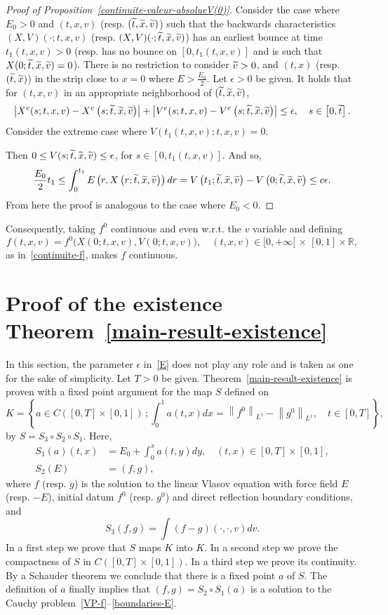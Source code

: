 \documentclass[AHL,Unicode,longabstracts,published]{cedram}
\newcommand{\R}{\mathbb{R}}
\let\oldtilde\tilde
\renewcommand*{\tilde}[1]{\mathchoice{\widetilde{#1}}{\widetilde{#1}}{\oldtilde{#1}}{\oldtilde{#1}}}
\begin{document}
\begin{proof}[{Proof of Proposition~\ref{continuite-valeur-absolueV(0)}}]
Consider the case where $E_0>0$ and $(t,x,v)$ (resp. $(\tilde{t},\tilde{x},\tilde{v})$) such that the backwards characteristics $(X,V)(\cdot;t,x,v)$ (resp. $(X,V)(\cdot;\tilde{t},\tilde{x},\tilde{v})$) has an earliest bounce at time $t_1(t,x,v)>0$ (resp. has no bounce on $[0,t_1(t,x,v)]$ and is such that $X(0;\tilde{t},\tilde{x},\tilde{v})= 0$). There is no restriction to consider $\tilde{v}>0$, and $(t,x)$ (resp. $(\tilde{t},\tilde{x})$) in the strip close to $x=0$ where $E>\frac{E_0}{2}$. Let $\epsilon >0$ be given. It holds that for $(t,x,v)$ in an appropriate neighborhood of $(\tilde{t},\tilde{x},\tilde{v})$,
\[
\left|X^e(s;t,x,v)-X^e\left(s;\tilde{t},\tilde{x},\tilde{v}\right)\right|+\left|V^e(s;t,x,v)-V^e\left(s;\tilde{t},\tilde{x},\tilde{v}\right)\right|\leq \epsilon, \quad s \in \left[0,\tilde{t}\right].
\]
Consider the extreme case where $V(t_1(t,x,v);t,x,v)= 0$.


Then $0 \leq V(s;\tilde{t},\tilde{x},\tilde{v})\leq \epsilon $, for $s\in [0,t_1(t,x,v)]$. And so,
\[
\frac{E_0}{2} t_1\leq \int_0^{t_1} E\left(r,X\left(r;\tilde{t},\tilde{x},\tilde{v}\right)\right)dr = V\left(t_1;\tilde{t},\tilde{x},\tilde{v}\right)-V\left(0;\tilde{t},\tilde{x},\tilde{v}\right) \leq c\epsilon.
\]
From here the proof is analogous to the case where $E_0<0$.
\end{proof}
Consequently, taking $f^0$ continuous and even w.r.t. the $v$ variable and defining
\[
f(t,x,v)=f^0\big(X(0;t,x,v),V(0;t,x,v)\big),\quad (t,x,v)\in [0,+\infty[\,\times\,[0,1] \times \R,
\]
as in~\eqref{continuite-f}, makes $f$ continuous.



\section{Proof of the existence Theorem~\ref{main-result-existence}}\label{pf-main-result-existence}


In this section, the parameter $\epsilon $ in~\eqref{E} does not play any role and is taken as one for the sake of simplicity. Let $T>0$ be given. Theorem~\ref{main-result-existence} is proven with a fixed point argument for the map $S$ defined on
\[
K = \left\{ a \in C([0,T] \times [0,1]) \, ; \int_0^1 a(t,x)dx = \left\|f^0\right\|_{L^1} - \left\|g^0\right\|_{L^1},\quad t\in [0,T] \right \},
\]
by $S= S_3 \circ S_2 \circ S_1$. Here,
\begin{align*}
S_1(a)(t,x) &= E_0 +\int_0^x a(t,y)dy, \quad (t,x)\in [0,T] \times [0,1],\\
S_2(E) &= (f,g),
\end{align*}
where $f$ (resp. $g$) is the solution to the linear Vlasov equation with force field $E$ (resp. $-E$), initial datum $f^0$ (resp. $g^0$) and direct reflection boundary conditions, and
\[
S_3(f,g) = \int (f-g)(\cdot, \cdot, v)dv.
\]
In a first step we prove that $S$ maps $K$ into $K$. In a second step we prove the compactness of $S$ in $C([0,T] \times [0,1])$. In a third step we prove its continuity. By a Schauder theorem we conclude that there is a fixed point $a$ of $S$. The definition of $a$ finally implies that $(f,g)= S_2\circ S_1(a)$ is a solution to the Cauchy problem~\eqref{VP-f}--\eqref{boundaries-E}.
\end{document}

